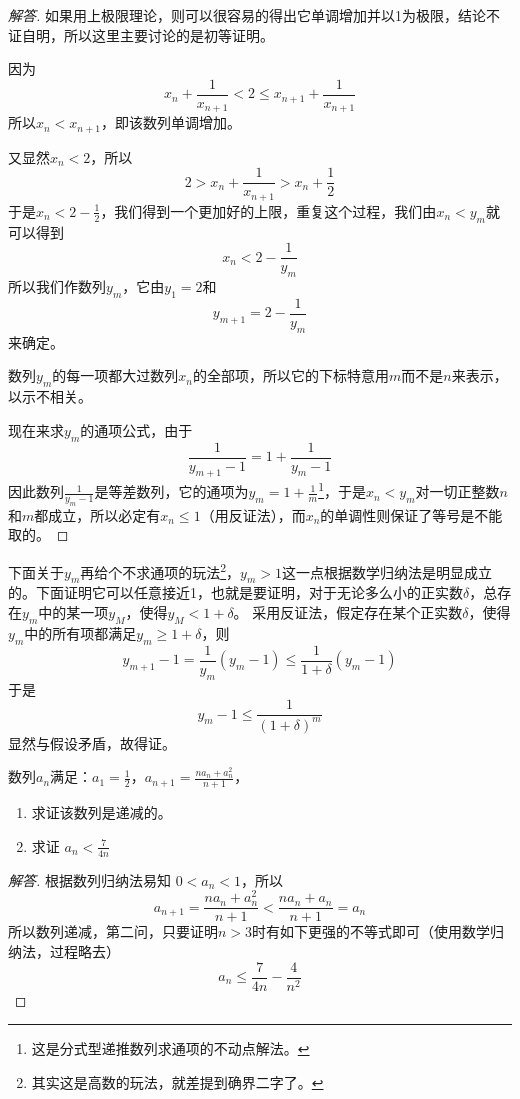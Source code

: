 \exerciseSolvedDate[2016-06-20]

\begin{proof}[解答]
  如果用上极限理论，则可以很容易的得出它单调增加并以1为极限，结论不证自明，所以这里主要讨论的是初等证明。

因为
$$
x_n+\frac{1}{x_{n+1}}<2 \leqslant 
x_{n+1}+\frac{1}{x_{n+1}}
$$
所以$x_n<x_{n+1}$，即该数列单调增加。

又显然$x_n<2$，所以
$$
2>x_n+\frac{1}{x_{n+1}}>x_n+\frac{1}{2}
$$
于是$x_n<2-\frac{1}{2}$，我们得到一个更加好的上限，重复这个过程，我们由$x_n<y_m$就可以得到
$$
x_n<2-\frac{1}{y_m}
$$
所以我们作数列$y_m$，它由$y_1=2$和
$$
y_{m+1}=2-\frac{1}{y_m}
$$
来确定。

数列$y_m$的每一项都大过数列$x_n$的全部项，所以它的下标特意用$m$而不是$n$来表示，以示不相关。

现在来求$y_m$的通项公式，由于
$$
\frac{1}{y_{m+1}-1}=1+\frac{1}{y_{m}-1}
$$
因此数列$\frac{1}{y_m-1}$是等差数列，它的通项为$y_m=1+\frac{1}{m}$\footnote{这是分式型递推数列求通项的不动点解法。}，于是$x_n<y_m$对一切正整数$n$和$m$都成立，所以必定有$x_n\leqslant 1$（用反证法），而$x_n$的单调性则保证了等号是不能取的。
\end{proof}

\begin{exerciseAdditional}
下面关于$y_m$再给个不求通项的玩法\footnote{其实这是高数的玩法，就差提到确界二字了。}，$y_m>1$这一点根据数学归纳法是明显成立的。下面证明它可以任意接近1，也就是要证明，对于无论多么小的正实数$\delta$，总存在$y_m$中的某一项$y_M$，使得$y_M<1+\delta$。
采用反证法，假定存在某个正实数$\delta$，使得$y_m$中的所有项都满足$y_m\geqslant 1+\delta$，则
$$
y_{m+1}-1=\frac{1}{y_m}(y_m-1)\leqslant 
\frac{1}{1+\delta}(y_m-1)
$$
于是
$$
y_m-1\leqslant \frac{1}{(1+\delta)^m}
$$
显然与假设矛盾，故得证。
\end{exerciseAdditional}

\begin{exercise}
  数列$a_n$满足：$a_1=\frac{1}{2}$，$a_{n+1}=\frac{na_n+a_n^2}{n+1}$，
  \begin{enumerate}
  \item 求证该数列是递减的。
  \item 求证 $a_n < \frac{7}{4n}$
  \end{enumerate}
\end{exercise}
\begin{proof}[解答]
  根据数列归纳法易知 $0<a_n<1$，所以
  \begin{equation*}
    a_{n+1}=\frac{na_n+a_n^2}{n+1} < \frac{na_n+a_n}{n+1} = a_n
  \end{equation*}
  所以数列递减，第二问，只要证明$n>3$时有如下更强的不等式即可（使用数学归纳法，过程略去）
  \begin{equation*}
    a_n \leqslant \frac{7}{4n}-\frac{4}{n^2}
  \end{equation*}
\end{proof}

